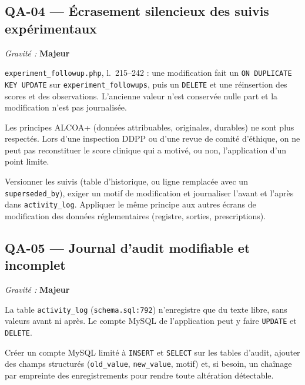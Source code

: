 \documentclass[11pt,a4paper]{article}
\newcommand{\maj}{\textcolor{maj}{\textbf{Majeur}}}
\newcommand{\f}[1]{\nolinkurl{#1}}
\newenvironment{constat}[3]{%
  \subsection*{#1 --- #2}\noindent\textit{Gravité :} #3\par\smallskip
  \begin{description}[leftmargin=2.6cm,style=nextline,itemsep=2pt]}{\end{description}}
\begin{document}
\begin{constat}{QA-04}{Écrasement silencieux des suivis expérimentaux}{\maj}
\item[Preuve] \f{experiment_followup.php}, l.~215--242 : une modification fait un
  \texttt{ON DUPLICATE KEY UPDATE} sur \f{experiment_followups}, puis un
  \f{DELETE} et une réinsertion des scores et des observations. L'ancienne valeur
  n'est conservée nulle part et la modification n'est pas journalisée.
\item[Risque] Les principes ALCOA+ (données attribuables, originales, durables)
  ne sont plus respectés. Lors d'une inspection DDPP ou d'une revue de comité
  d'éthique, on ne peut pas reconstituer le score clinique qui a motivé, ou non,
  l'application d'un point limite.
\item[Action] Versionner les suivis (table d'historique, ou ligne \og
  remplacée\fg{} avec un \f{superseded_by}), exiger un motif de modification et
  journaliser l'avant et l'après dans \f{activity_log}. Appliquer le même
  principe aux autres écrans de modification des données réglementaires
  (registre, sorties, prescriptions).
\end{constat}

\begin{constat}{QA-05}{Journal d'audit modifiable et incomplet}{\maj}
\item[Preuve] La table \f{activity_log} (\f{schema.sql:792}) n'enregistre que du
  texte libre, sans valeurs avant ni après. Le compte MySQL de l'application peut
  y faire \f{UPDATE} et \f{DELETE}.
\item[Action] Créer un compte MySQL limité à \f{INSERT} et \f{SELECT} sur les
  tables d'audit, ajouter des champs structurés (\f{old_value},
  \f{new_value}, motif) et, si besoin, un chaînage par empreinte des
  enregistrements pour rendre toute altération détectable.
\end{constat}
\end{document}
